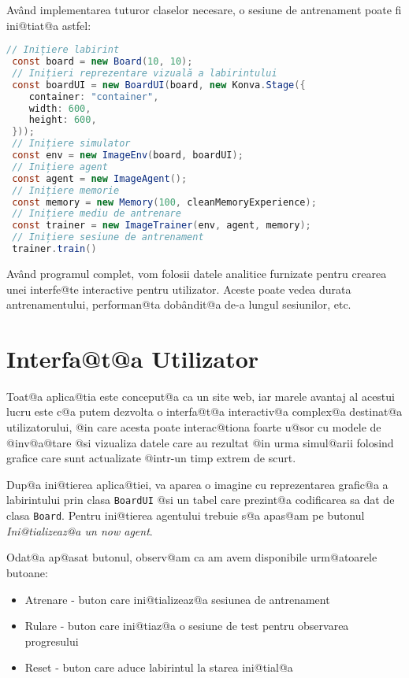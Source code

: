 Av\^ and implementarea tuturor claselor necesare, o sesiune de antrenament poate fi ini@tiat@a astfel:

\begin{lstlisting}[language=Java, caption={Inițierea unei sesiuni complete de antrenament}]
 // Inițiere labirint
 const board = new Board(10, 10);
 // Inițieri reprezentare vizuală a labirintului
 const boardUI = new BoardUI(board, new Konva.Stage({
	container: "container",
	width: 600,
	height: 600,
 }));
 // Inițiere simulator
 const env = new ImageEnv(board, boardUI);
 // Inițiere agent
 const agent = new ImageAgent();
 // Inițiere memorie
 const memory = new Memory(100, cleanMemoryExperience);
 // Inițiere mediu de antrenare
 const trainer = new ImageTrainer(env, agent, memory);
 // Inițiere sesiune de antrenament
 trainer.train()
\end{lstlisting}

Av\^ and programul complet, vom folosii datele analitice furnizate pentru crearea unei interfe@te interactive pentru utilizator. Aceste poate vedea durata antrenamentului, performan@ta dob\^ andit@a de-a lungul sesiunilor, etc.

\section{Interfa@t@a Utilizator}

Toat@a aplica@tia este conceput@a ca un site web, iar marele avantaj al acestui lucru este c@a putem dezvolta o interfa@t@a interactiv@a complex@a destinat@a utilizatorului, @in care acesta poate interac@tiona foarte u@sor cu modele de @inv@a@tare @si vizualiza datele care au rezultat @in urma simul@arii folosind grafice care sunt actualizate @intr-un timp extrem de scurt.

Dup@a ini@tierea aplica@tiei, va aparea o imagine cu reprezentarea grafic@a a labirintului prin clasa \texttt{BoardUI} @si un tabel care prezint@a codificarea sa dat de clasa \texttt{Board}. Pentru ini@tierea agentului trebuie s@a apas@am pe butonul \textsl{Ini@tializeaz@a un now agent}.

Odat@a ap@asat butonul, observ@am ca am avem disponibile urm@atoarele butoane:
\begin{itemize}
	\item Atrenare - buton care ini@tializeaz@a sesiunea de antrenament
	\item Rulare - buton care ini@tiaz@a o sesiune de test pentru observarea progresului
	\item Reset - buton care aduce labirintul la starea ini@tial@a
\end{itemize}

